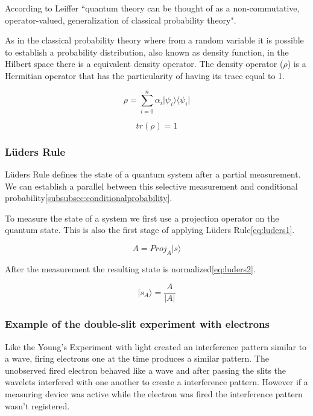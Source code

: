 According to Leiffer\cite{Leifer2008} ``quantum theory can be thought of as a non-commutative, operator-valued, generalization of classical probability theory". 


As in the classical probability theory where from a random variable it is possible to establish a probability distribution, also known as density function, in the Hilbert space there is a equivalent density operator.
The density operator ($\rho$) is a Hermitian operator that has the particularity of having its trace equal to 1\cite{VanRijsbergen2004}.

\begin{equation}
\label{eq_trace1}
\rho = \sum_{i=0}^{n} \alpha_{i} \vert\psi_{i}\rangle\langle\psi_{i}\vert
\end{equation} 

\begin{equation}
\label{eq_trace1}
tr( \rho ) = 1
\end{equation}


\subsubsection{L\"{u}ders Rule}
\label{subsubsec:ludersrule}
L\"{u}ders Rule defines the state of a quantum system after a partial measurement. We can establish a parallel between this selective measurement and conditional probability\ref{subsubsec:conditionalprobability}\cite{Busch2009}.

To measure the state of a system we first use a projection operator on the quantum state. This is also the first stage of applying L\"{u}ders Rule\ref{eq:luders1}.

\begin{equation}
\label{eq:luders1}
A=Proj_{A}\vert s\rangle
\end{equation}

After the measurement the resulting state is normalized\ref{eq:luders2}.

\begin{equation}
\label{eq:luders2}
\vert s_{A}\rangle=\frac{A}{\vert A\vert}
\end{equation}

\subsubsection{Example of the double-slit experiment with electrons}
\label{subsubsec:double_slit}
 Like the Young's Experiment with light created an interference pattern similar to a wave, firing electrons one at the time produces a similar pattern. The unobserved fired electron behaved like a wave and after passing the slits the wavelets interfered with one another to create a interference pattern. However if a measuring device was active while the electron was fired the interference pattern wasn't registered. 

